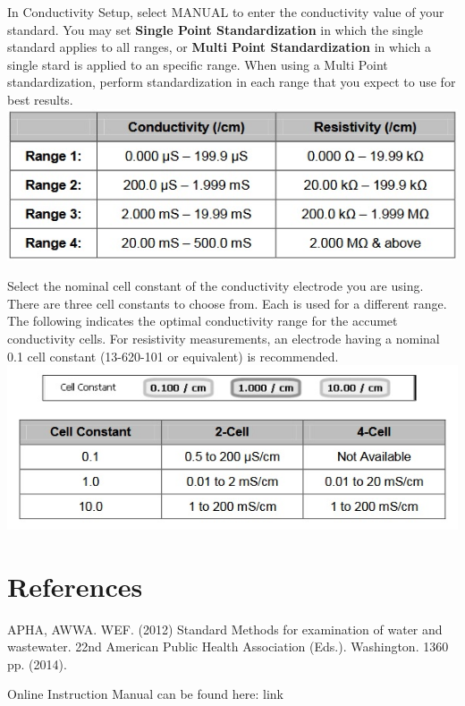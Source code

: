 \documentclass[12pt]{../SOP3_beta}\usepackage[]{graphicx}\usepackage[]{color}
\begin{document}
\NP In Conductivity Setup, select MANUAL to enter the conductivity value of your standard. You may set \textbf{Single Point Standardization} in which the single standard applies to all ranges, or \textbf{Multi Point Standardization} in which a single stard is applied to an specific range. When using a Multi Point standardization, perform standardization in each range that you expect to use for best results.
\NP\includegraphics{Conducivityranges.jpg}

 Select the nominal cell constant of the conductivity electrode you are using. There are three cell constants to choose from. Each is used for a different range. The following indicates the optimal conductivity range for the accumet conductivity cells. For resistivity measurements, an electrode having a nominal 0.1 cell constant (13-620-101 or equivalent) is recommended.
\NP\includegraphics{CellConstant.jpg}

\section{References}

\NP APHA, AWWA. WEF. (2012) Standard Methods for examination of water and wastewater. 22nd American Public Health Association (Eds.). Washington. 1360 pp. (2014).

\NP Online Instruction Manual can be found here: link
\end{document}
